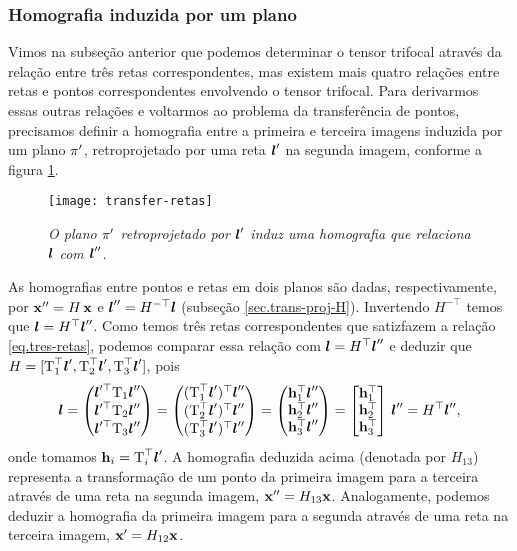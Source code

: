 \subsubsection{Homografia induzida por um plano}\label{sec.homo-plano-tri}
Vimos na subseção anterior que podemos determinar o tensor trifocal através da relação entre três retas correspondentes, mas existem mais quatro relações entre retas e pontos  correspondentes envolvendo o tensor trifocal. Para derivarmos essas outras relações e voltarmos ao problema da transferência de pontos, precisamos definir a homografia entre a primeira e terceira imagens induzida por um plano $\pi'$, retroprojetado por uma reta $\boldsymbol{l}'$ na segunda imagem, conforme a figura \ref{fig.transfer-retas}.
\begin{figure}[!htb]
\centering
\texttt{[image: transfer-retas]}
\caption{{\it O plano $\pi'$ retroprojetado por $\boldsymbol{l}'$ induz uma homografia que relaciona $\boldsymbol{l}$ com $\boldsymbol{l}''$.}}
\label{fig.transfer-retas}
\end{figure}
As homografias entre pontos e retas em dois planos são dadas, respectivamente, por $\mathbf{x}''=H\,\mathbf{x}$ e $\boldsymbol{l}''=H^{-\top}\boldsymbol{l}$ (subseção \ref{sec.trans-proj-H}). Invertendo $H^{-\top}$ temos que $\boldsymbol{l}=H^\top\boldsymbol{l}''$. Como temos três retas correspondentes que satizfazem a relação \ref{eq.tres-retas}, podemos comparar essa relação com $\boldsymbol{l}=H^\top\boldsymbol{l}''$ e deduzir que $H=[\mbox{T}_1^\top\boldsymbol{l}',\mbox{T}_2^\top\boldsymbol{l}',\mbox{T}_3^\top\boldsymbol{l}']$, pois
\begin{equation*}
\boldsymbol{l}=
\begin{pmatrix}
\boldsymbol{l}'^\top \mbox{T}_1\boldsymbol{l}''\\
\boldsymbol{l}'^\top \mbox{T}_2\boldsymbol{l}''\\
\boldsymbol{l}'^\top \mbox{T}_3\boldsymbol{l}''
\end{pmatrix}=
\begin{pmatrix}
(\mbox{T}_1^\top\boldsymbol{l}')^\top\boldsymbol{l}''\\
(\mbox{T}_2^\top\boldsymbol{l}')^\top\boldsymbol{l}''\\
(\mbox{T}_3^\top\boldsymbol{l}')^\top\boldsymbol{l}''
\end{pmatrix}=
\begin{pmatrix}
{\bf h}_1^\top\boldsymbol{l}''\\
{\bf h}_2^\top\boldsymbol{l}''\\
{\bf h}_3^\top\boldsymbol{l}''
\end{pmatrix}=
\begin{bmatrix}
{\bf h}_1^\top\\
{\bf h}_2^\top\\
{\bf h}_3^\top
\end{bmatrix}\,\boldsymbol{l}''=
H^\top\boldsymbol{l}'',
\end{equation*}
onde tomamos ${\bf h}_i=\mbox{T}_i^\top\boldsymbol{l}'$.
A homografia deduzida acima (denotada por $H_{13}$) representa a transformação de um ponto da primeira imagem para a terceira através de uma reta na segunda imagem, $\mathbf{x}''=H_{13}\mathbf{x}$. Analogamente, podemos deduzir a homografia da primeira imagem para a segunda através de uma reta na terceira imagem, $\mathbf{x}'=H_{12}\mathbf{x}$.

